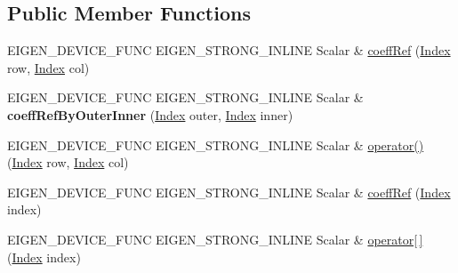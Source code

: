 \subsection*{Public Member Functions}
\begin{DoxyCompactItemize}
\item 
E\+I\+G\+E\+N\+\_\+\+D\+E\+V\+I\+C\+E\+\_\+\+F\+U\+NC E\+I\+G\+E\+N\+\_\+\+S\+T\+R\+O\+N\+G\+\_\+\+I\+N\+L\+I\+NE Scalar \& \mbox{\hyperlink{class_eigen_1_1_dense_coeffs_base_3_01_derived_00_01_write_accessors_01_4_adf14e9563a1d2a39a6fee334dfcfb105}{coeff\+Ref}} (\mbox{\hyperlink{struct_eigen_1_1_eigen_base_a554f30542cc2316add4b1ea0a492ff02}{Index}} row, \mbox{\hyperlink{struct_eigen_1_1_eigen_base_a554f30542cc2316add4b1ea0a492ff02}{Index}} col)
\item 
\mbox{\label{class_eigen_1_1_dense_coeffs_base_3_01_derived_00_01_write_accessors_01_4_a0b33b72feb2983b690abf8179c59f544}} 
E\+I\+G\+E\+N\+\_\+\+D\+E\+V\+I\+C\+E\+\_\+\+F\+U\+NC E\+I\+G\+E\+N\+\_\+\+S\+T\+R\+O\+N\+G\+\_\+\+I\+N\+L\+I\+NE Scalar \& {\bfseries coeff\+Ref\+By\+Outer\+Inner} (\mbox{\hyperlink{struct_eigen_1_1_eigen_base_a554f30542cc2316add4b1ea0a492ff02}{Index}} outer, \mbox{\hyperlink{struct_eigen_1_1_eigen_base_a554f30542cc2316add4b1ea0a492ff02}{Index}} inner)
\item 
E\+I\+G\+E\+N\+\_\+\+D\+E\+V\+I\+C\+E\+\_\+\+F\+U\+NC E\+I\+G\+E\+N\+\_\+\+S\+T\+R\+O\+N\+G\+\_\+\+I\+N\+L\+I\+NE Scalar \& \mbox{\hyperlink{class_eigen_1_1_dense_coeffs_base_3_01_derived_00_01_write_accessors_01_4_ab0c40ee1944059a3e32a125cf794d547}{operator()}} (\mbox{\hyperlink{struct_eigen_1_1_eigen_base_a554f30542cc2316add4b1ea0a492ff02}{Index}} row, \mbox{\hyperlink{struct_eigen_1_1_eigen_base_a554f30542cc2316add4b1ea0a492ff02}{Index}} col)
\item 
E\+I\+G\+E\+N\+\_\+\+D\+E\+V\+I\+C\+E\+\_\+\+F\+U\+NC E\+I\+G\+E\+N\+\_\+\+S\+T\+R\+O\+N\+G\+\_\+\+I\+N\+L\+I\+NE Scalar \& \mbox{\hyperlink{class_eigen_1_1_dense_coeffs_base_3_01_derived_00_01_write_accessors_01_4_a3187593ec72fc6f4fa64a86e0383375b}{coeff\+Ref}} (\mbox{\hyperlink{struct_eigen_1_1_eigen_base_a554f30542cc2316add4b1ea0a492ff02}{Index}} index)
\item 
E\+I\+G\+E\+N\+\_\+\+D\+E\+V\+I\+C\+E\+\_\+\+F\+U\+NC E\+I\+G\+E\+N\+\_\+\+S\+T\+R\+O\+N\+G\+\_\+\+I\+N\+L\+I\+NE Scalar \& \mbox{\hyperlink{class_eigen_1_1_dense_coeffs_base_3_01_derived_00_01_write_accessors_01_4_a38f5d78476b3db56db98853af750cf31}{operator\mbox{[}$\,$\mbox{]}}} (\mbox{\hyperlink{struct_eigen_1_1_eigen_base_a554f30542cc2316add4b1ea0a492ff02}{Index}} index)

\end{DoxyCompactItemize}
